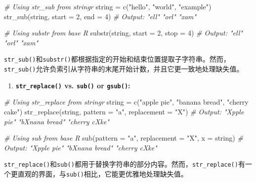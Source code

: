 \documentclass[
]{article}
\newenvironment{Shaded}{}{}
\newcommand{\AttributeTok}[1]{\textcolor[rgb]{0.49,0.56,0.16}{#1}}
\newcommand{\CommentTok}[1]{\textcolor[rgb]{0.38,0.63,0.69}{\textit{#1}}}
\newcommand{\DecValTok}[1]{\textcolor[rgb]{0.25,0.63,0.44}{#1}}
\newcommand{\FunctionTok}[1]{\textcolor[rgb]{0.02,0.16,0.49}{#1}}
\newcommand{\NormalTok}[1]{#1}
\newcommand{\OtherTok}[1]{\textcolor[rgb]{0.00,0.44,0.13}{#1}}
\newcommand{\StringTok}[1]{\textcolor[rgb]{0.25,0.44,0.63}{#1}}
\begin{document}
\begin{Shaded}
\begin{Highlighting}[]
\CommentTok{\# Using str\_sub from stringr}
\NormalTok{string }\OtherTok{=} \FunctionTok{c}\NormalTok{(}\StringTok{"hello"}\NormalTok{, }\StringTok{"world"}\NormalTok{, }\StringTok{"example"}\NormalTok{)}
\FunctionTok{str\_sub}\NormalTok{(string, }\AttributeTok{start =} \DecValTok{2}\NormalTok{, }\AttributeTok{end =} \DecValTok{4}\NormalTok{)}
\CommentTok{\# Output: "ell" "orl" "xam"}

\CommentTok{\# Using substr from base R}
\FunctionTok{substr}\NormalTok{(string, }\AttributeTok{start =} \DecValTok{2}\NormalTok{, }\AttributeTok{stop =} \DecValTok{4}\NormalTok{)}
\CommentTok{\# Output: "ell" "orl" "xam"}
\end{Highlighting}
\end{Shaded}

\texttt{str\_sub()}和\texttt{substr()}都根据指定的开始和结束位置提取子字符串。然而，\texttt{str\_sub()}允许负索引从字符串的末尾开始计数，并且它更一致地处理缺失值。

\begin{enumerate}
\def\labelenumi{\arabic{enumi}.}
\item
  \textbf{\texttt{str\_replace()} vs. \texttt{sub()} or
  \texttt{gsub()}:}
\end{enumerate}

\begin{Shaded}
\begin{Highlighting}[]
\CommentTok{\# Using str\_replace from stringr}
\NormalTok{string }\OtherTok{=} \FunctionTok{c}\NormalTok{(}\StringTok{"apple pie"}\NormalTok{, }\StringTok{"banana bread"}\NormalTok{, }\StringTok{"cherry cake"}\NormalTok{)}
\FunctionTok{str\_replace}\NormalTok{(string, }\AttributeTok{pattern =} \StringTok{"a"}\NormalTok{, }\AttributeTok{replacement =} \StringTok{"X"}\NormalTok{)}
\CommentTok{\# Output: "Xpple pie"    "bXnana bread" "cherry cXke" }

\CommentTok{\# Using sub from base R}
\FunctionTok{sub}\NormalTok{(}\AttributeTok{pattern =} \StringTok{"a"}\NormalTok{, }\AttributeTok{replacement =} \StringTok{"X"}\NormalTok{, }\AttributeTok{x =}\NormalTok{ string)}
\CommentTok{\# Output: "Xpple pie" "bXnana bread" "cherry cXke"}
\end{Highlighting}
\end{Shaded}

\texttt{str\_replace()}和\texttt{sub()}都用于替换字符串的部分内容。然而，\texttt{str\_replace()}有一个更直观的界面，与\texttt{sub()}相比，它能更优雅地处理缺失值。
\end{document}
